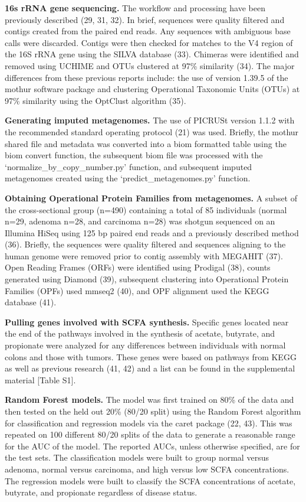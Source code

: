 \documentclass[11pt,]{article}
\begin{document}
\textbf{16s rRNA gene sequencing.} The workflow and processing have been
previously described (29, 31, 32). In brief, sequences were quality
filtered and contigs created from the paired end reads. Any sequences
with ambiguous base calls were discarded. Contigs were then checked for
matches to the V4 region of the 16S rRNA gene using the SILVA database
(33). Chimeras were identified and removed using UCHIME and OTUs
clustered at 97\% similarity (34). The major differences from these
previous reports include: the use of version 1.39.5 of the mothur
software package and clustering Operational Taxonomic Units (OTUs) at
97\% similarity using the OptClust algorithm (35).

\textbf{Generating imputed metagenomes.} The use of PICRUSt version
1.1.2 with the recommended standard operating protocol (21) was used.
Briefly, the mothur shared file and metadata was converted into a biom
formatted table using the biom convert function, the subsequent biom
file was processed with the `normalize\_by\_copy\_number.py' function,
and subsequent imputed metagenomes created using the
`predict\_metagenomes.py' function.

\textbf{Obtaining Operational Protein Families from metagenomes.} A
subset of the cross-sectional group (n=490) containing a total of 85
individuals (normal n=29, adenoma n=28, and carcinoma n=28) was shotgun
sequenced on an Illumina HiSeq using 125 bp paired end reads and a
previously described method (36). Briefly, the sequences were quality
filtered and sequences aligning to the human genome were removed prior
to contig assembly with MEGAHIT (37). Open Reading Frames (ORFs) were
identified using Prodigal (38), counts generated using Diamond (39),
subsequent clustering into Operational Protein Families (OPFs) used
mmseq2 (40), and OPF alignment used the KEGG database (41).

\textbf{Pulling genes involved with SCFA synthesis.} Specific genes
located near the end of the pathways involved in the synthesis of
acetate, butyrate, and propionate were analyzed for any differences
between individuals with normal colons and those with tumors. These
genes were based on pathways from KEGG as well as previous research (41,
42) and a list can be found in the supplemental material {[}Table S1{]}.

\textbf{Random Forest models.} The model was first trained on 80\% of
the data and then tested on the held out 20\% (80/20 split) using the
Random Forest algorithm for classification and regression models via the
caret package (22, 43). This was repeated on 100 different 80/20 splits
of the data to generate a reasonable range for the AUC of the model. The
reported AUCs, unless otherwise specified, are for the test sets. The
classification models were built to group normal versus adenoma, normal
versus carcinoma, and high versus low SCFA concentrations. The
regression models were built to classify the SCFA concentrations of
acetate, butyrate, and propionate regardless of disease status.
\end{document}
